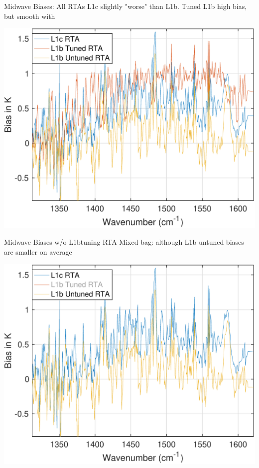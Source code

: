 \documentclass[10pt,t]{beamer}
\begin{document}
\begin{frame}[label={sec:org68cebb3}]{Midwave Biases: All RTAs}
L1c slightly "worse" than L1b.  Tuned L1b high bias, but smooth with \wn
\begin{center}
\includegraphics[width=0.75\linewidth]{./bias_3rta_mw.pdf}
\end{center}
\end{frame}
\begin{frame}[label={sec:org5d2824b}]{Midwave Biases w/o L1btuning RTA}
Mixed bag: although L1b untuned biases are smaller on average
\begin{center}
\includegraphics[width=0.75\linewidth]{./bias_3rta_mw_noL1btuning.pdf}
\end{center}
\end{frame}
\end{document}
